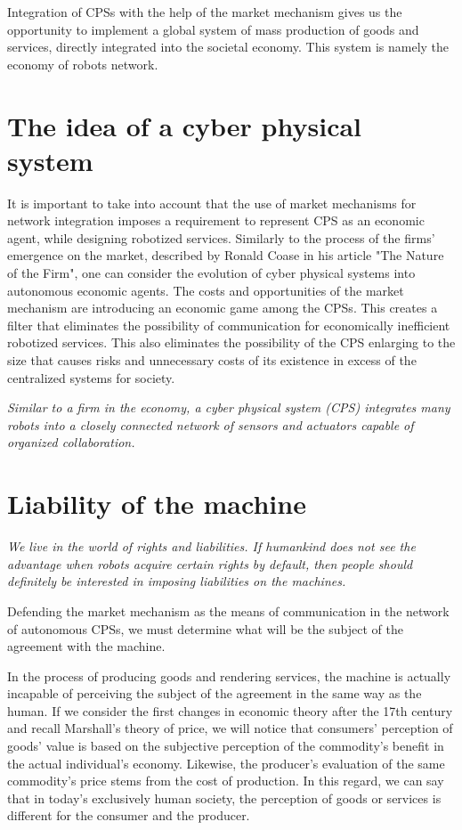 \documentclass{article}
\begin{document}
Integration of CPSs with the help of the market mechanism gives us the opportunity to implement a global system of mass production of goods and services, directly integrated into the societal economy. This system is namely the economy of robots network.

\section{The idea of a cyber physical system}

It is important to take into account that the use of market mechanisms for network integration imposes a requirement to represent CPS as an economic agent, while designing robotized services. Similarly to the process of the firms' emergence on the market, described by Ronald Coase in his article "The Nature of the Firm", one can consider the evolution of cyber physical systems into autonomous economic agents. The costs and opportunities of the market mechanism are introducing an economic game among the CPSs. This creates a filter that eliminates the possibility of communication for economically inefficient robotized services. This also eliminates the possibility of the CPS enlarging to the size that causes risks and unnecessary costs of its existence in excess of the centralized systems for society.

\textit{Similar to a firm in the economy, a cyber physical system (CPS) integrates many robots into a closely connected network of sensors and actuators capable of organized collaboration.}

\section{Liability of the machine}

\textit{We live in the world of rights and liabilities. If humankind does not see the advantage when robots acquire certain rights by default, then people should definitely be interested in imposing liabilities on the machines.}

Defending the market mechanism as the means of communication in the network of autonomous CPSs, we must determine what will be the subject of the agreement with the machine.

In the process of producing goods and rendering services, the machine is actually incapable of perceiving the subject of the agreement in the same way as the human. If we consider the first changes in economic theory after the 17th century and recall Marshall's theory of price, we will notice that consumers' perception of goods' value is based on the subjective perception of the commodity's benefit in the actual individual's economy. Likewise, the producer's evaluation of the same commodity's price stems from the cost of production. In this regard, we can say that in today's exclusively human society, the perception of goods or services is different for the consumer and the producer. 
\end{document}
